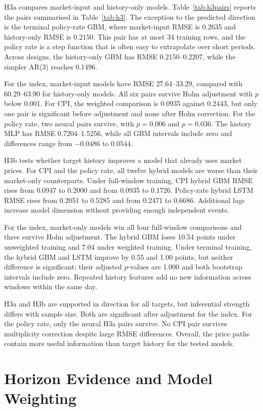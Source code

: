 \documentclass[12pt,a4paper]{report}
\begin{document}
H3a compares market-input and history-only models. Table~\ref{tab:h3pairs}
reports the pairs summarised in Table~\ref{tab:h3}. The exception to the
predicted direction is the terminal policy-rate GBM, where
market-input RMSE is 0.2635 and history-only RMSE is 0.2150. This pair has at
most 34 training rows, and the policy rate is a step function that is often
easy to extrapolate over short periods. Across designs, the history-only GBM
has RMSE 0.2150--0.2207, while the simpler AR(3) reaches 0.1496.

For the index, market-input models have RMSE 27.64--33.29, compared with
60.29--63.90 for history-only models. All six pairs survive Holm adjustment
with $p$ below 0.001. For CPI, the weighted comparison is 0.0935 against 0.2443, but
only one pair is significant before adjustment and none after Holm correction.
For the policy rate, two neural pairs survive, with $p = 0.006$ and $p = 0.036$.
The history MLP has RMSE 0.7204--1.5256, while all GBM intervals include zero
and differences range from $-0.0486$ to $0.0544$.

H3b tests whether target history improves a model that already uses market
prices. For CPI and the policy rate, all twelve hybrid models are worse than
their market-only counterparts. Under full-window training, CPI hybrid GBM
RMSE rises from 0.0947 to 0.2000 and from 0.0935 to 0.1726. Policy-rate hybrid
LSTM RMSE rises from 0.2051 to 0.5285 and from 0.2471 to 0.6686. Additional
lags increase model dimension without providing enough independent events.

For the index, market-only models win all four full-window comparisons and
three survive Holm adjustment. The hybrid GBM loses 10.54 points under
unweighted training and 7.04 under weighted training. Under terminal training,
the hybrid GBM and LSTM improve by 0.55 and 1.00 points, but neither difference
is significant; their adjusted $p$-values are 1.000 and both bootstrap
intervals include zero. Repeated history
features add no new information across windows within the same day.

H3a and H3b are supported in direction for all targets, but inferential
strength differs with sample size. Both are significant after adjustment for
the index. For the policy rate, only the neural H3a pairs survive. No CPI pair
survives multiplicity correction despite large RMSE differences. Overall, the
price paths contain more useful information than target history for the tested
models.

\clearpage
\section{Horizon Evidence and Model Weighting}
\label{sec:results-h5}
\end{document}
